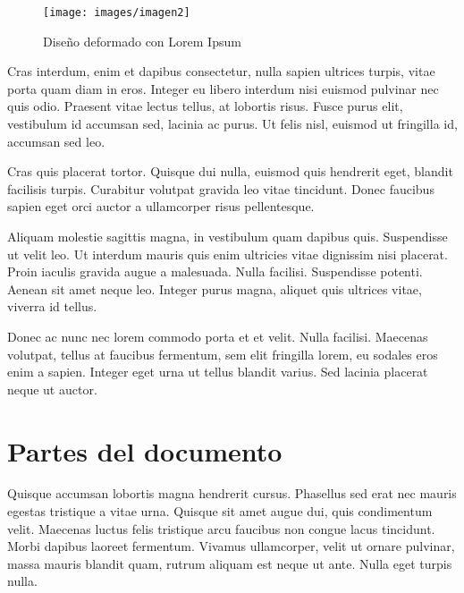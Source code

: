 \documentclass[12pt,a4paper]{report}
\begin{document}
\begin{figure}[h]
\centering
\texttt{[image: images/imagen2]}
\caption{Diseño deformado con Lorem Ipsum}
\label{figure.diseno2}
\end{figure}




Cras interdum, enim et dapibus consectetur, nulla sapien ultrices turpis, vitae porta quam diam in eros. Integer eu libero interdum nisi euismod pulvinar nec quis odio. Praesent vitae lectus tellus, at lobortis risus. Fusce purus elit, vestibulum id accumsan sed, lacinia ac purus. Ut felis nisl, euismod ut fringilla id, accumsan sed leo. 

Cras quis placerat tortor. Quisque dui nulla, euismod quis hendrerit eget, blandit facilisis turpis. Curabitur volutpat gravida leo vitae tincidunt. Donec faucibus sapien eget orci auctor a ullamcorper risus pellentesque.

Aliquam molestie sagittis magna, in vestibulum quam dapibus quis. Suspendisse ut velit leo. Ut interdum mauris quis enim ultricies vitae dignissim nisi placerat. Proin iaculis gravida augue a malesuada. Nulla facilisi. Suspendisse potenti. Aenean sit amet neque leo. Integer purus magna, aliquet quis ultrices vitae, viverra id tellus. 

Donec ac nunc nec lorem commodo porta et et velit. Nulla facilisi. Maecenas volutpat, tellus at faucibus fermentum, sem elit fringilla lorem, eu sodales eros enim a sapien. Integer eget urna ut tellus blandit varius. Sed lacinia placerat neque ut auctor.



\section{Partes del documento}
\label{seccion.partes}



Quisque accumsan lobortis magna hendrerit cursus. Phasellus sed erat nec mauris egestas tristique a vitae urna. Quisque sit amet augue dui, quis condimentum velit. Maecenas luctus felis tristique arcu faucibus non congue lacus tincidunt. Morbi dapibus laoreet fermentum. Vivamus ullamcorper, velit ut ornare pulvinar, massa mauris blandit quam, rutrum aliquam est neque ut ante. Nulla eget turpis nulla. 
\end{document}
